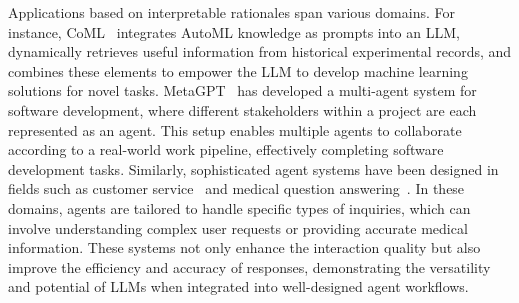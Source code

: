 Applications based on interpretable rationales span various domains. For instance, CoML~\cite{zhang-etal-2024-mlcopilot} integrates AutoML knowledge as prompts into an LLM, dynamically retrieves useful information from historical experimental records, and combines these elements to empower the LLM to develop machine learning solutions for novel tasks. MetaGPT~\cite{hong2023metagpt} has developed a multi-agent system for software development, where different stakeholders within a project are each represented as an agent. This setup enables multiple agents to collaborate according to a real-world work pipeline, effectively completing software development tasks. Similarly, sophisticated agent systems have been designed in fields such as customer service~\cite{abbasian2023conversational} and medical question answering~\cite{tang2023medagents}. In these domains, agents are tailored to handle specific types of inquiries, which can involve understanding complex user requests or providing accurate medical information. These systems not only enhance the interaction quality but also improve the efficiency and accuracy of responses, demonstrating the versatility and potential of LLMs when integrated into well-designed agent workflows.